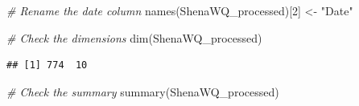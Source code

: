 \documentclass[
  12pt,
]{article}
\newenvironment{Shaded}{\begin{snugshade}}{\end{snugshade}}
\newcommand{\CommentTok}[1]{\textcolor[rgb]{0.56,0.35,0.01}{\textit{#1}}}
\newcommand{\DecValTok}[1]{\textcolor[rgb]{0.00,0.00,0.81}{#1}}
\newcommand{\FunctionTok}[1]{\textcolor[rgb]{0.00,0.00,0.00}{#1}}
\newcommand{\NormalTok}[1]{#1}
\newcommand{\OtherTok}[1]{\textcolor[rgb]{0.56,0.35,0.01}{#1}}
\newcommand{\StringTok}[1]{\textcolor[rgb]{0.31,0.60,0.02}{#1}}
\begin{document}
\begin{Shaded}
\begin{Highlighting}[]
\CommentTok{\# Rename the date column}
\FunctionTok{names}\NormalTok{(ShenaWQ\_processed)[}\DecValTok{2}\NormalTok{] }\OtherTok{\textless{}{-}} \StringTok{"Date"}

\CommentTok{\# Check the dimensions}
\FunctionTok{dim}\NormalTok{(ShenaWQ\_processed)}
\end{Highlighting}
\end{Shaded}

\begin{verbatim}
## [1] 774  10
\end{verbatim}

\begin{Shaded}
\begin{Highlighting}[]
\CommentTok{\# Check the summary}
\FunctionTok{summary}\NormalTok{(ShenaWQ\_processed)}
\end{Highlighting}
\end{Shaded}
\end{document}
